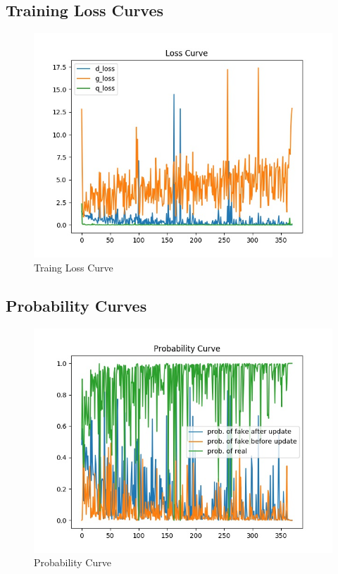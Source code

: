 \documentclass[12pt,a4paper]{article}
\begin{document}
\subsection{Training Loss Curves}
\begin{figure}[hbt]
\centering
\includegraphics[scale=0.7]{loss.png}
\caption{Traing Loss Curve}
\label{fig:loss}
\end{figure}
\subsection{Probability Curves}
\begin{figure}[hbt]
\centering
\includegraphics[scale=0.7]{prob.png}
\caption{Probability Curve}
\label{fig:prob}
\end{figure}
\end{document}
